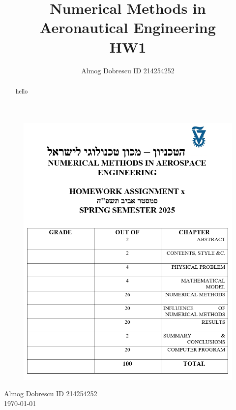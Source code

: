 \documentclass[11pt, a4paper]{article}
\title{Numerical Methods in Aeronautical Engineering \\ HW1}
\author{Almog Dobrescu ID 214254252}
\begin{document}
\pagestyle{empty}
\begin{figure}[H]
    \centering
    \includegraphics[width=\textwidth]{./../../Cover page for computational assignments 2025.png}
    \label{fig: cover page}
\end{figure}
\begin{center}
    \Huge
    Almog Dobrescu \qquad ID 214254252 \\ \vspace{0.5cm}
    \today
\end{center}
\newpage

\begin{abstract}
    hello
\end{abstract}

\tableofcontents
\vfil
\listoffigures
\newpage

\printnomenclature
\newpage

\pagestyle{fancy}
\setcounter{page}{1}
\end{document}
